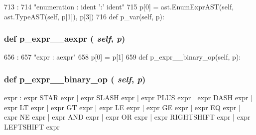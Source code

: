 \begin{DoxyCode}
713                               :
714         "enumeration : ident ':' ident"
715         p[0] = ast.EnumExprAST(self, ast.TypeAST(self, p[1]), p[3])
716 
    def p_var(self, p):
\end{DoxyCode}
\hypertarget{classslicc_1_1parser_1_1SLICC_a19c8ee869a956f0f8ff0cc76c60bea40}{
\subsubsection[{p\_\-expr\_\-\_\-aexpr}]{\setlength{\rightskip}{0pt plus 5cm}def p\_\-expr\_\-\_\-aexpr ( {\em self}, \/   {\em p})}}
\label{classslicc_1_1parser_1_1SLICC_a19c8ee869a956f0f8ff0cc76c60bea40}



\begin{DoxyCode}
656                               :
657         "expr : aexpr"
658         p[0] = p[1]
659 
    def p_expr__binary_op(self, p):
\end{DoxyCode}
\hypertarget{classslicc_1_1parser_1_1SLICC_ad3ab7bf47fe2daa12fb9103972144b2b}{
\subsubsection[{p\_\-expr\_\-\_\-binary\_\-op}]{\setlength{\rightskip}{0pt plus 5cm}def p\_\-expr\_\-\_\-binary\_\-op ( {\em self}, \/   {\em p})}}
\label{classslicc_1_1parser_1_1SLICC_ad3ab7bf47fe2daa12fb9103972144b2b}
\begin{DoxyVerb}expr : expr STAR  expr
| expr SLASH expr
| expr PLUS  expr
| expr DASH  expr
| expr LT    expr
| expr GT    expr
| expr LE    expr
| expr GE    expr
| expr EQ    expr
| expr NE    expr
| expr AND   expr
| expr OR    expr
| expr RIGHTSHIFT expr
| expr LEFTSHIFT  expr\end{DoxyVerb}
 


